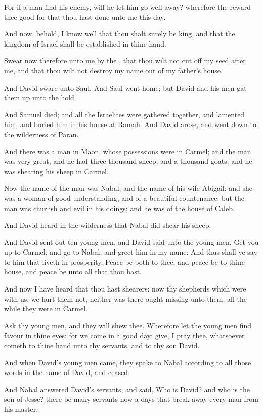 \Verse For if a man find his enemy, will he let him go well away?  wherefore the \LORD reward thee good for that thou hast done unto me this day.

\Verse And now, behold, I know well that thou shalt surely be king, and that the kingdom of Israel shall be established in thine hand.

\Verse Swear now therefore unto me by the \LORD, that thou wilt not cut off my seed after me, and that thou wilt not destroy my name out of my father's house.

\Verse And David sware unto Saul. And Saul went home; but David and his men gat them up unto the hold.


\Chapter
\Verse And Samuel died; and all the Israelites were gathered together, and lamented him, and buried him in his house at Ramah. And David arose, and went down to the wilderness of Paran.

\Verse And there was a man in Maon, whose possessions were in Carmel; and the man was very great, and he had three thousand sheep, and a thousand goats: and he was shearing his sheep in Carmel.

\Verse Now the name of the man was Nabal; and the name of his wife Abigail: and she was a woman of good understanding, and of a beautiful countenance: but the man was churlish and evil in his doings; and he was of the house of Caleb.

\Verse And David heard in the wilderness that Nabal did shear his sheep.

\Verse And David sent out ten young men, and David said unto the young men, Get you up to Carmel, and go to Nabal, and greet him in my name: \Verse And thus shall ye say to him that liveth in prosperity, Peace be both to thee, and peace be to thine house, and peace be unto all that thou hast.

\Verse And now I have heard that thou hast shearers: now thy shepherds which were with us, we hurt them not, neither was there ought missing unto them, all the while they were in Carmel.

\Verse Ask thy young men, and they will shew thee. Wherefore let the young men find favour in thine eyes: for we come in a good day: give, I pray thee, whatsoever cometh to thine hand unto thy servants, and to thy son David.

\Verse And when David's young men came, they spake to Nabal according to all those words in the name of David, and ceased.

\Verse And Nabal answered David's servants, and said, Who is David? and who is the son of Jesse? there be many servants now a days that break away every man from his master.

